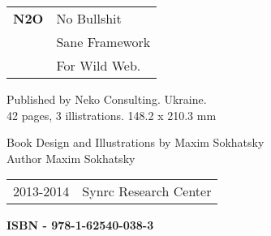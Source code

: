 \begingroup
\footnotesize
\parindent 0pt
\parskip 
\baselineskip
\begin{tabular}{ll}
{\bf N2O} & No Bullshit \\
    & Sane Framework \\
    & For Wild Web. \\
\end{tabular}

Published by Neko Consulting. Ukraine. \\
42 pages, 3 illistrations. 148.2 x 210.3 mm

Book Design and Illustrations by Maxim Sokhatsky \\
Author Maxim Sokhatsky \\



\begin{tabular}{ll}
\textcopyright{} 2013-2014 & Synrc Research Center
\end{tabular}

{\bf  ISBN - 978-1-62540-038-3\hspace{2em}}
\endgroup

   \thispagestyle{empty}
